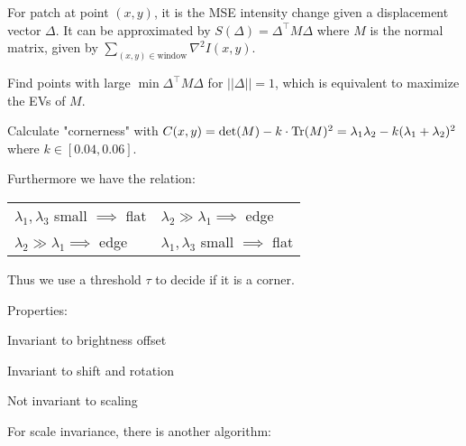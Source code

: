 \begin{definition}
For patch at point \((x, y)\), it is the MSE intensity change given a displacement vector \(\Delta\).
It can be approximated by \(S(\Delta) = \Delta^\top M \Delta\)
where \(M\) is the normal matrix, given by \(\sum_{(x, y) \in \text{window}} \nabla^2 I(x, y)\).

\end{definition}


\begin{algorithm}
  Find points with large \(\min \Delta^\top M \Delta\) for \(||\Delta|| = 1\), which is equivalent to maximize the EVs of \(M\).

  Calculate "cornerness" with \(C(x, y) = \det(M) - k \cdot \operatorname{Tr}(M)^2 = \lambda_1 \lambda_2 - k(\lambda_1 + \lambda_2)^2\) where \(k \in [0.04, 0.06]\).

  Furthermore we have the relation:

  \begin{center}
    \begin{tabularx}{\linewidth}{XX}
      \(\lambda_1, \lambda_3\) small \(\implies\) flat & \(\lambda_2 \gg \lambda_1 \implies\) edge \\
      \(\lambda_2 \gg \lambda_1 \implies\) edge & \(\lambda_1, \lambda_3\) small \(\implies\) flat
    \end{tabularx}
  \end{center}

  Thus we use a threshold \(\tau\) to decide if it is a corner.

  Properties:
  \begin{itemize*}
    \item Invariant to brightness offset
    \item Invariant to shift and rotation
    \item Not invariant to scaling
  \end{itemize*}
\end{algorithm}

For scale invariance, there is another algorithm:

